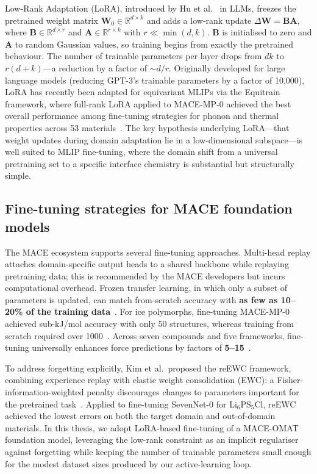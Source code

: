 \documentclass[12pt,a4paper,oneside]{book}
\begin{document}
Low-Rank Adaptation (LoRA), introduced by Hu et al.~\cite{Hu2021} in LLMs, freezes the pretrained weight matrix $\mathbf{W}_0 \in \mathbb{R}^{d \times k}$ and adds a low-rank update $\Delta\mathbf{W} = \mathbf{B}\mathbf{A}$, where $\mathbf{B} \in \mathbb{R}^{d \times r}$ and $\mathbf{A} \in \mathbb{R}^{r \times k}$ with $r \ll \min(d,k)$. $\mathbf{B}$ is initialised to zero and $\mathbf{A}$ to random Gaussian values, so training begins from exactly the pretrained behaviour. The number of trainable parameters per layer drops from $dk$ to $r(d+k)$---a reduction by a factor of $\sim d/r$. Originally developed for large language models (reducing GPT-3's trainable parameters by a factor of 10,000), LoRA has recently been adapted for equivariant MLIPs via the Equitrain framework, where full-rank LoRA applied to MACE-MP-0 achieved the best overall performance among fine-tuning strategies for phonon and thermal properties across 53 materials~\cite{Equitrain2025}. The key hypothesis underlying LoRA---that weight updates during domain adaptation lie in a low-dimensional subspace---is well suited to MLIP fine-tuning, where the domain shift from a universal pretraining set to a specific interface chemistry is substantial but structurally simple.

\subsection{Fine-tuning strategies for MACE foundation models}

The MACE ecosystem supports several fine-tuning approaches. Multi-head replay attaches domain-specific output heads to a shared backbone while replaying pretraining data; this is recommended by the MACE developers but incurs computational overhead. Frozen transfer learning, in which only a subset of parameters is updated, can match from-scratch accuracy with \textbf{as few as 10--20\% of the training data}~\cite{Radova2025}. For ice polymorphs, fine-tuning MACE-MP-0 achieved sub-kJ/mol accuracy with only 50 structures, whereas training from scratch required over 1000~\cite{Kaur2025}. Across seven compounds and five frameworks, fine-tuning universally enhances force predictions by factors of \textbf{5--15}~\cite{Hanseroth2025}.

To address forgetting explicitly, Kim et al.\ proposed the reEWC framework, combining experience replay with elastic weight consolidation (EWC): a Fisher-information-weighted penalty discourages changes to parameters important for the pretrained task~\cite{Kim2025}. Applied to fine-tuning SevenNet-0 for Li$_6$PS$_5$Cl, reEWC achieved the lowest errors on both the target domain and out-of-domain materials. In this thesis, we adopt LoRA-based fine-tuning of a MACE-OMAT foundation model, leveraging the low-rank constraint as an implicit regulariser against forgetting while keeping the number of trainable parameters small enough for the modest dataset sizes produced by our active-learning loop.
\end{document}
